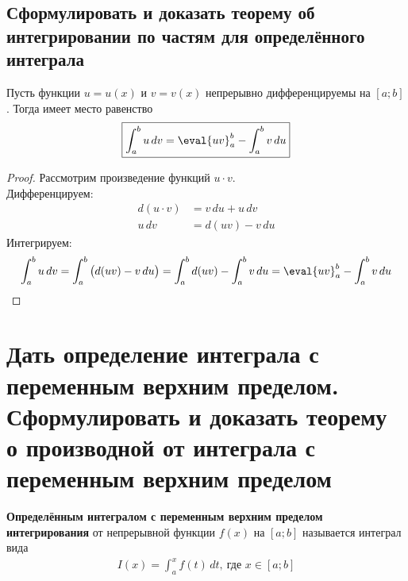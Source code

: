 \subsection{Сформулировать и доказать теорему об интегрировании по частям для определённого интеграла}

\begin{theorem}
    Пусть функции $u = u(x)$ и $v = v(x)$ непрерывно дифференцируемы на $[a;b]$. Тогда имеет место равенство
    \[
        \boxed{\int_{a}^{b} u\, dv = \eval{uv}_{a}^{b} - \int_{a}^{b} v\, du}
    \]
\end{theorem}
\begin{proof}
    Рассмотрим произведение функций $u\cdot v$. \\
    Дифференцируем: \vspace{-\topsep}
    \begin{align*}
        d(u\cdot v) &=  v\, du + u\, dv \\ 
        u\, dv &= d(u v) - v\, du
    \end{align*}
    Интегрируем:
    \begin{align*}
        \int_{a}^{b} u\, dv = \int_{a}^{b} \big(d(uv) - v\, du\big) = \int_{a}^{b} d(uv) - \int_{a}^{b} v\, du = \eval{uv}_{a}^{b} - \int_{a}^{b} v\, du
    \end{align*}
\end{proof}

\newpage
\section{Дать определение интеграла с переменным верхним пределом. Сформулировать и доказать теорему о производной от интеграла с переменным верхним пределом} 

\begin{definition}
    \textbf{Определённым интегралом с переменным верхним пределом интегрирования} от непрерывной функции $f(x)$ на $[a;b]$ называется интеграл вида
    \begin{gather*}
        \boxed{I(x) = \int_{a}^{x} f(t)\, dt},\ \text{где } x\in [a;b]
    \end{gather*}
\end{definition}

